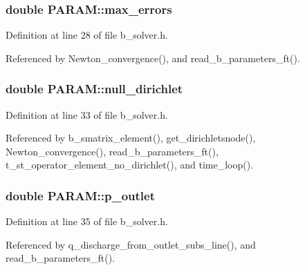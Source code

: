 \hypertarget{struct_p_a_r_a_m_ac69e7b750bf4a304aa03871456e5345d}{
\subsubsection[{max\-\_\-errors}]{\setlength{\rightskip}{0pt plus 5cm}double P\-A\-R\-A\-M\-::max\-\_\-errors}}\label{struct_p_a_r_a_m_ac69e7b750bf4a304aa03871456e5345d}


Definition at line 28 of file b\-\_\-solver.\-h.



Referenced by Newton\-\_\-convergence(), and read\-\_\-b\-\_\-parameters\-\_\-ft().

\hypertarget{struct_p_a_r_a_m_a0ed670f674e3fdb1657eb6c40aed2a75}{
\subsubsection[{null\-\_\-dirichlet}]{\setlength{\rightskip}{0pt plus 5cm}double P\-A\-R\-A\-M\-::null\-\_\-dirichlet}}\label{struct_p_a_r_a_m_a0ed670f674e3fdb1657eb6c40aed2a75}


Definition at line 33 of file b\-\_\-solver.\-h.



Referenced by b\-\_\-smatrix\-\_\-element(), get\-\_\-dirichletsnode(), Newton\-\_\-convergence(), read\-\_\-b\-\_\-parameters\-\_\-ft(), t\-\_\-st\-\_\-operator\-\_\-element\-\_\-no\-\_\-dirichlet(), and time\-\_\-loop().

\hypertarget{struct_p_a_r_a_m_ab9e16ccc88b168342b0a6a2fe1bb7070}{
\subsubsection[{p\-\_\-outlet}]{\setlength{\rightskip}{0pt plus 5cm}double P\-A\-R\-A\-M\-::p\-\_\-outlet}}\label{struct_p_a_r_a_m_ab9e16ccc88b168342b0a6a2fe1bb7070}


Definition at line 35 of file b\-\_\-solver.\-h.



Referenced by q\-\_\-discharge\-\_\-from\-\_\-outlet\-\_\-subs\-\_\-line(), and read\-\_\-b\-\_\-parameters\-\_\-ft().

